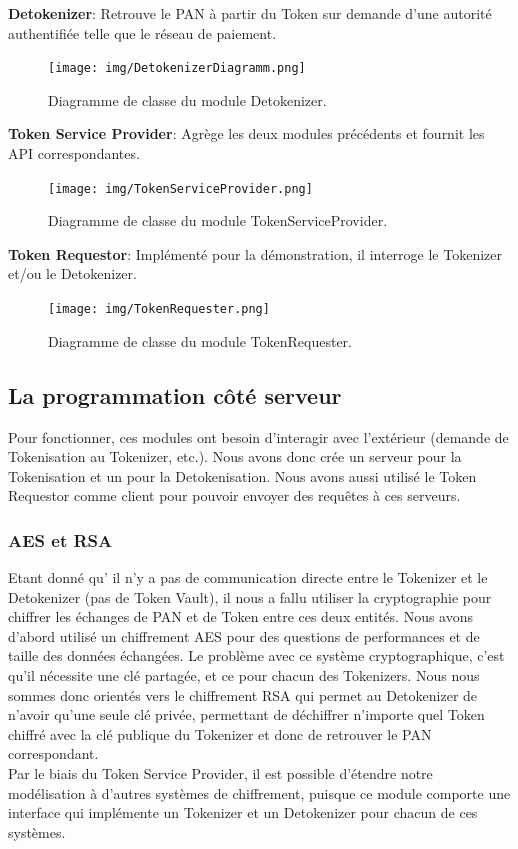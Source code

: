 \documentclass{report}
\begin{document}
\noindent
\textbf{Detokenizer}: Retrouve le PAN à partir du Token sur demande d'une autorité authentifiée telle que le réseau de paiement.

\begin{figure}[!ht]
    \centering
			\texttt{[image: img/DetokenizerDiagramm.png]}
			\caption{\label{Architecture} Diagramme de classe du module Detokenizer.}			
\end{figure}

\noindent
\textbf{Token Service Provider}: Agrège les deux modules précédents et fournit les API correspondantes.

\begin{figure}[!ht]
    \centering
			\texttt{[image: img/TokenServiceProvider.png]}
			\caption{\label{Architecture} Diagramme de classe du module TokenServiceProvider.}			
\end{figure}

\noindent
\textbf{Token Requestor}: Implémenté pour la démonstration, il interroge le Tokenizer et/ou le Detokenizer.

\begin{figure}[!ht]
    \centering
			\texttt{[image: img/TokenRequester.png]}
			\caption{\label{Architecture} Diagramme de classe du module TokenRequester.}			
\end{figure}

\subsection{La programmation côté serveur}
Pour fonctionner, ces modules ont besoin d'interagir avec l'extérieur (demande de Tokenisation au Tokenizer, etc.). Nous avons donc crée un serveur pour la Tokenisation et un pour la Detokenisation. Nous avons aussi utilisé le Token Requestor comme client pour pouvoir envoyer des requêtes à ces serveurs.

\subsubsection{AES et RSA}
Etant donné qu' il n'y a pas de communication directe entre le Tokenizer et le Detokenizer (pas de Token Vault), il nous a fallu utiliser la cryptographie pour chiffrer les échanges de PAN et de Token entre ces deux entités. Nous avons d'abord utilisé un chiffrement AES pour des questions de performances et de taille des données échangées. Le problème avec ce système cryptographique, c'est qu'il nécessite une clé partagée, et ce pour chacun des Tokenizers. Nous nous sommes donc orientés vers le chiffrement RSA qui permet au Detokenizer de n'avoir qu'une seule clé privée, permettant de déchiffrer n'importe quel Token chiffré avec la clé publique du Tokenizer et donc de retrouver le PAN correspondant.\\
Par le biais du Token Service Provider, il est possible d'étendre notre modélisation à d'autres systèmes de chiffrement, puisque ce module comporte une interface qui implémente un Tokenizer et un Detokenizer pour chacun de ces systèmes.\\
\end{document}
